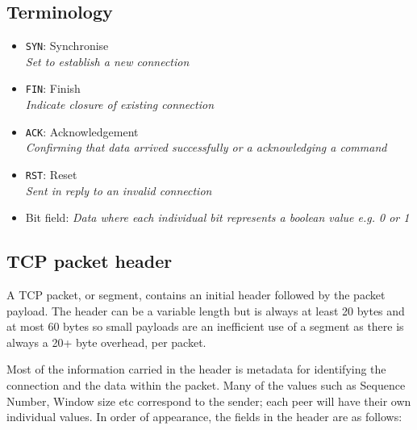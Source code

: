 \documentclass[11pt,a4paper,british]{bhamarticle}
\begin{document}
\begin{multicols}{2}
\subsection{Terminology}
\begin{itemize}
    \item \texttt{SYN}: Synchronise\\
        \textit{Set to establish a new connection}
    \item \texttt{FIN}: Finish\\
        \textit{Indicate closure of existing connection}
    \item \texttt{ACK}: Acknowledgement\\
        \textit{Confirming that data arrived successfully or a acknowledging a command}
    \item \texttt{RST}: Reset\\
        \textit{Sent in reply to an invalid connection}
    \item Bit field: \textit{Data where each individual bit represents a boolean value e.g. 0 or 1}
\end{itemize}

\subsection{TCP packet header}
A TCP packet, or segment, contains an initial header followed by the packet payload. The header can be a variable length but is always at least 20 bytes and at most 60 bytes so small payloads are an inefficient use of a segment as there is always a 20+ byte overhead, per packet.

Most of the information carried in the header is metadata for identifying the connection and the data within the packet. Many of the values such as Sequence Number, Window size etc correspond to the sender; each peer will have their own individual values. In order of appearance, the fields in the header are as follows:


\end{multicols}
\end{document}

